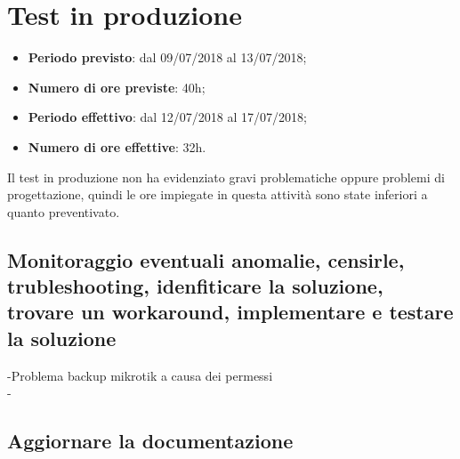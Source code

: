 \documentclass[Realizzazione.tex]{subfiles}
\begin{document}
\section{Test in produzione}
\begin{itemize}
	\item \textbf{Periodo previsto}: dal 09/07/2018 al 13/07/2018;
	\item \textbf{Numero di ore previste}: 40h;
	\item \textbf{Periodo effettivo}: dal 12/07/2018 al 17/07/2018;
	\item \textbf{Numero di ore effettive}: 32h.
\end{itemize}
Il test in produzione non ha evidenziato gravi problematiche oppure problemi di progettazione, quindi le ore impiegate in questa attività sono state inferiori a quanto preventivato.

\subsection{Monitoraggio eventuali anomalie, censirle, trubleshooting, idenfiticare la soluzione, trovare un workaround, implementare e testare la soluzione}
-Problema backup mikrotik a causa dei permessi\\
-
\subsection{Aggiornare la documentazione}
\end{document}
